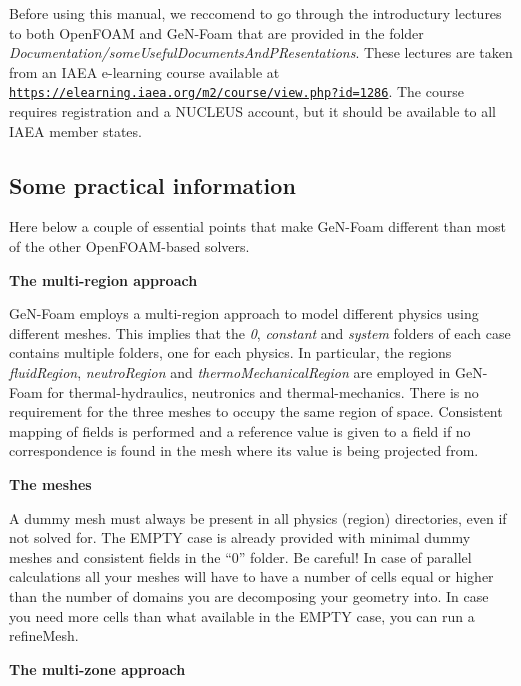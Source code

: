 Before using this manual, we reccomend to go through the introductury lectures to both Open\+F\+O\+AM and Ge\+N-\/\+Foam that are provided in the folder {\itshape Documentation/some\+Useful\+Documents\+And\+P\+Resentations}. These lectures are taken from an I\+A\+EA e-\/learning course available at \href{https://elearning.iaea.org/m2/course/view.php?id=1286}{\tt https\+://elearning.\+iaea.\+org/m2/course/view.\+php?id=1286}. The course requires registration and a N\+U\+C\+L\+E\+US account, but it should be available to all I\+A\+EA member states.

\subsection*{Some practical information}

Here below a couple of essential points that make Ge\+N-\/\+Foam different than most of the other Open\+F\+O\+A\+M-\/based solvers.

{\bfseries The multi-\/region approach}

Ge\+N-\/\+Foam employs a multi-\/region approach to model different physics using different meshes. This implies that the {\itshape 0}, {\itshape constant} and {\itshape system} folders of each case contains multiple folders, one for each physics. In particular, the regions {\itshape fluid\+Region}, {\itshape neutro\+Region} and {\itshape thermo\+Mechanical\+Region} are employed in Ge\+N-\/\+Foam for thermal-\/hydraulics, neutronics and thermal-\/mechanics. There is no requirement for the three meshes to occupy the same region of space. Consistent mapping of fields is performed and a reference value is given to a field if no correspondence is found in the mesh where its value is being projected from.

 {\bfseries The meshes}

A dummy mesh must always be present in all physics (region) directories, even if not solved for. The E\+M\+P\+TY case is already provided with minimal dummy meshes and consistent fields in the “0” folder. Be careful! In case of parallel calculations all your meshes will have to have a number of cells equal or higher than the number of domains you are decomposing your geometry into. In case you need more cells than what available in the E\+M\+P\+TY case, you can run a refine\+Mesh. 

{\bfseries The multi-\/zone approach}

